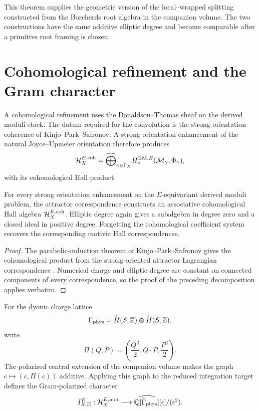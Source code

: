 This theorem supplies the geometric version of the local--wrapped splitting constructed from the Borcherds root algebra in the companion volume.  The two constructions have the same additive elliptic degree and become comparable after a primitive root framing is chosen.

\chapter{Cohomological refinement and the Gram character}
A cohomological refinement uses the Donaldson--Thomas sheaf on the derived moduli stack.  The datum required for the convolution is the strong orientation coherence of Kinjo--Park--Safronov.  A strong orientation enhancement of the natural Joyce--Upmeier orientation therefore produces
\[
 \mathcal H_X^{E,\mathrm{coh}}
 =\widehat\bigoplus_{\gamma\in\Gamma_X}
 H_*^{\mathrm{BM},E}(\mathcal M_\gamma,\Phi_\gamma),
\]
with its cohomological Hall product.

\begin{theorem}
For every strong orientation enhancement on the $E$-equivariant derived moduli problem, the attractor correspondence constructs an associative cohomological Hall algebra $\mathcal H_X^{E,\mathrm{coh}}$.  Elliptic degree again gives a subalgebra in degree zero and a closed ideal in positive degree.  Forgetting the cohomological coefficient system recovers the corresponding motivic Hall correspondences.
\end{theorem}
\begin{proof}
The parabolic-induction theorem of Kinjo--Park--Safronov gives the cohomological product from the strong-oriented attractor Lagrangian correspondence \cite{KPS}.  Numerical charge and elliptic degree are constant on connected components of every correspondence, so the proof of the preceding decomposition applies verbatim.
\end{proof}

For the dyonic charge lattice
\[
 \Gamma_{\mathrm{phys}}
 =\widetilde H(S,\mathbb Z)\oplus\widetilde H(S,\mathbb Z),
\]
write
\[
 \Pi(Q,P)=\left(\frac{Q^2}{2},Q\cdot P,\frac{P^2}{2}\right).
\]
The polarized central extension of the companion volume makes the graph $c\mapsto(c,\Pi(c))$ additive.  Applying this graph to the reduced integration target defines the Gram-polarized character
\[
 I_{X,\Pi}^E:
 \mathcal H_X^{E,\mathrm{mot}}
 \longrightarrow
 \widehat{\mathbb Q[\widetilde\Gamma_{\mathrm{phys}}]}[\epsilon]/(\epsilon^2).
\]

